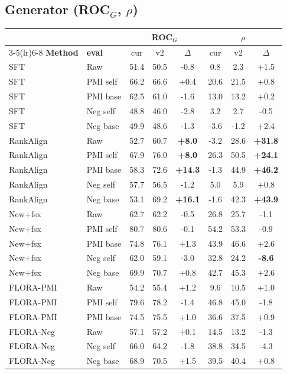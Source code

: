 \documentclass[10pt]{article}
\begin{document}
\subsection*{Generator (ROC$_G$, $\rho$)}
\begin{center}\footnotesize\setlength{\tabcolsep}{4pt}
\begin{tabular}{ll ccc ccc}
\toprule
& & \multicolumn{3}{c}{\textbf{ROC}$_G$} & \multicolumn{3}{c}{\textbf{$\rho$}} \\
\cmidrule(lr){3-5}\cmidrule(lr){6-8}
\textbf{Method} & \textbf{eval} & cur & v2 & $\Delta$ & cur & v2 & $\Delta$ \\
\midrule
SFT & Raw & 51.4 & 50.5 & -0.8 & 0.8 & 2.3 & +1.5 \\
SFT & PMI self & 66.2 & 66.6 & +0.4 & 20.6 & 21.5 & +0.8 \\
SFT & PMI base & 62.5 & 61.0 & -1.6 & 13.0 & 13.2 & +0.2 \\
SFT & Neg self & 48.8 & 46.0 & -2.8 & 3.2 & 2.7 & -0.5 \\
SFT & Neg base & 49.9 & 48.6 & -1.3 & -3.6 & -1.2 & +2.4 \\
\midrule
RankAlign & Raw & 52.7 & 60.7 & \textbf{+8.0} & -3.2 & 28.6 & \textbf{+31.8} \\
RankAlign & PMI self & 67.9 & 76.0 & \textbf{+8.0} & 26.3 & 50.5 & \textbf{+24.1} \\
RankAlign & PMI base & 58.3 & 72.6 & \textbf{+14.3} & -1.3 & 44.9 & \textbf{+46.2} \\
RankAlign & Neg self & 57.7 & 56.5 & -1.2 & 5.0 & 5.9 & +0.8 \\
RankAlign & Neg base & 53.1 & 69.2 & \textbf{+16.1} & -1.6 & 42.3 & \textbf{+43.9} \\
\midrule
New+fsx & Raw & 62.7 & 62.2 & -0.5 & 26.8 & 25.7 & -1.1 \\
New+fsx & PMI self & 80.7 & 80.6 & -0.1 & 54.2 & 53.3 & -0.9 \\
New+fsx & PMI base & 74.8 & 76.1 & +1.3 & 43.9 & 46.6 & +2.6 \\
New+fsx & Neg self & 62.0 & 59.1 & -3.0 & 32.8 & 24.2 & \textbf{-8.6} \\
New+fsx & Neg base & 69.9 & 70.7 & +0.8 & 42.7 & 45.3 & +2.6 \\
\midrule
FLORA-PMI & Raw & 54.2 & 55.4 & +1.2 & 9.6 & 10.5 & +1.0 \\
FLORA-PMI & PMI self & 79.6 & 78.2 & -1.4 & 46.8 & 45.0 & -1.8 \\
FLORA-PMI & PMI base & 74.5 & 75.5 & +1.0 & 36.6 & 37.5 & +0.9 \\
\midrule
FLORA-Neg & Raw & 57.1 & 57.2 & +0.1 & 14.5 & 13.2 & -1.3 \\
FLORA-Neg & Neg self & 66.0 & 64.2 & -1.8 & 38.8 & 34.5 & -4.3 \\
FLORA-Neg & Neg base & 68.9 & 70.5 & +1.5 & 39.5 & 40.4 & +0.8 \\
\bottomrule
\end{tabular}
\end{center}
\end{document}
